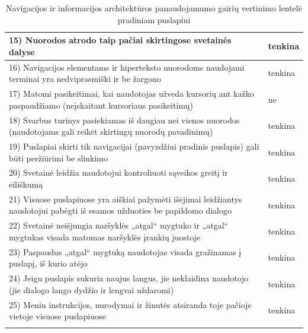 \documentclass{VUMIFPSkursinis}
\begin{document}
\begin{center}
\begin{longtable}{ |p{}|p{2cm}| }
	15) Nuorodos atrodo taip pačiai skirtingose svetainės dalyse & tenkina \\ \hline
	16) Navigacijos elementams ir hiperteksto nuorodoms naudojami terminai yra nedviprasmiški ir be žargono & tenkina \\ \hline
	17) Matomi pasikeitimai, kai naudotojas užveda kursorių ant kažko paspaudžiamo (neįskaitant kursoriaus pasikeitimų) & ne \\ \hline
	18) Svarbus turinys pasiekiamas iš daugiau nei vienos nuorodos (naudotojams gali reikėt skirtingų nuorodų pavadinimų) & tenkina \\ \hline
	19) Puslapiai skirti tik navigacijai (pavyzdžiui pradinis puslapis) gali būti peržiūrimi be slinkimo & tenkina \\ \hline
	20) Svetainė leidžia naudotojui kontroliuoti sąveikos greitį ir eiliškumą & tenkina \\ \hline
	21) Visuose puslapiuose yra aiškiai pažymėti išėjimai leidžiantys naudotojui pabėgti iš esamos užduoties be papildomo dialogo & tenkina \\ \hline
	22) Svetainė neišjungia naršyklės „atgal“ mygtuko ir „atgal“ mygtukas visada matomas naršyklės įrankių juostoje & tenkina \\ \hline
	23) Paspaudus „atgal“ mygtuką naudotojas visada gražinamas į puslapį, iš kurio atėjo & tenkina \\ \hline
	24) Jeigu puslapis sukuria naujus langus, jie neklaidina naudotojo (jie dialogo lango dydžio ir lengvai uždaromi) & tenkina \\ \hline
	25) Meniu instrukcijos, nurodymai ir žinutės atsiranda toje pačioje vietoje visuose puslapiuose & tenkina \\ \hline
	\caption{Navigacijos ir informacijos architektūros panaudojamumo gairių vertinimo lentelė pradiniam puslapiui}
	\label{navigacijosirIAlentelėPrad}
\end{longtable}
\end{center}
\end{document}
